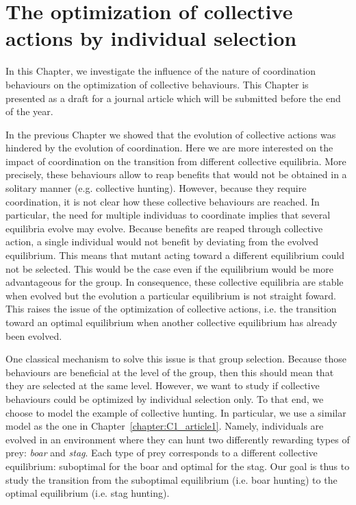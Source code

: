\chapter{The optimization of collective actions by individual selection}
\label{chapter:C1_article2}

\setcounter{minitocdepth}{1}
\minitoc[n] %

In this Chapter, we investigate the influence of the nature of coordination behaviours on the optimization of collective behaviours. This Chapter is presented as a draft for a journal article which will be submitted before the end of the year.


In the previous Chapter we showed that the evolution of collective actions was hindered by the evolution of coordination. Here we are more interested on the impact of coordination on the transition from different collective equilibria. More precisely, these behaviours allow to reap benefits that would not be obtained in a solitary manner (e.g. collective hunting). However, because they require coordination, it is not clear how these collective behaviours are reached. In particular, the need for multiple individuas to coordinate implies that several equilibria evolve may evolve. Because benefits are reaped through collective action, a single individual would not benefit by deviating from the evolved equilibrium. This means that mutant acting toward a different equilibrium could not be selected. This would be the case even if the equilibrium would be more advantageous for the group. In consequence, these collective equilibria are stable when evolved but the evolution a particular equilibrium is not straight foward. This raises the issue of the optimization of collective actions, i.e. the transition toward an optimal equilibrium when another collective equilibrium has already been evolved.

One classical mechanism to solve this issue is that group selection. Because those behaviours are beneficial at the level of the group, then this should mean that they are selected at the same level. However, we want to study if collective behaviours could be optimized by individual selection only. To that end, we choose to model the example of collective hunting. In particular, we use a similar model as the one in Chapter~\ref{chapter:C1_article1}. Namely, individuals are evolved in an environment where they can hunt two differently rewarding types of prey: \emph{boar} and \emph{stag}. Each type of prey corresponds to a different collective equilibrium: suboptimal for the boar and optimal for the stag. Our goal is thus to study the transition from the suboptimal equilibrium (i.e. boar hunting) to the optimal equilibrium (i.e. stag hunting).

